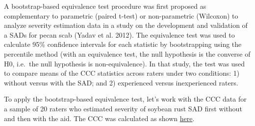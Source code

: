 \documentclass[
  letterpaper,
]{book}
\begin{document}
A bootstrap-based equivalence test procedure was first proposed as
complementary to parametric (paired t-test) or non-parametric (Wilcoxon)
to analyze severity estimation data in a study on the development and
validation of a SADs for pecan scab (Yadav et al. 2012). The equivalence
test was used to calculate 95\% confidence intervals for each statistic
by bootstrapping using the percentile method (with an equivalence test,
the null hypothesis is the converse of H0, i.e.~the null hypothesis is
non-equivalence). In that study, the test was used to compare means of
the CCC statistics across raters under two conditions: 1) without versus
with the SAD; and 2) experienced versus inexperienced raters.

To apply the bootstrap-based equivalence test, let's work with the CCC
data for a sample of 20 raters who estimated severity of soybean rust
SAD first without and then with the aid. The CCC was calculated as shown
\protect\hyperlink{concordance-correlation-coefficient}{here}.
\end{document}
